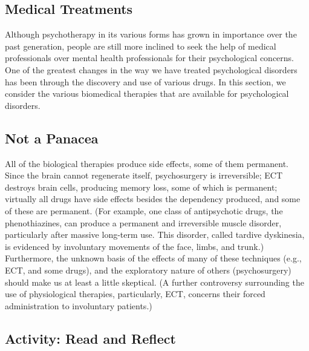 \documentclass[
]{book}
\begin{document}
\hypertarget{medical-treatments}{%
\subsection*{Medical Treatments}\label{medical-treatments}}

Although psychotherapy in its various forms has grown in importance over the past generation, people are still more inclined to seek the help of medical professionals over mental health professionals for their psychological concerns. One of the greatest changes in the way we have treated psychological disorders has been through the discovery and use of various drugs. In this section, we consider the various biomedical therapies that are available for psychological disorders.

\hypertarget{not-a-panacea}{%
\subsection*{Not a Panacea}\label{not-a-panacea}}

All of the biological therapies produce side effects, some of them permanent. Since the brain cannot regenerate itself, psychosurgery is irreversible; ECT destroys brain cells, producing memory loss, some of which is permanent; virtually all drugs have side effects besides the dependency produced, and some of these are permanent. (For example, one class of antipsychotic drugs, the phenothiazines, can produce a permanent and irreversible muscle disorder, particularly after massive long-term use. This disorder, called tardive dyskinesia, is evidenced by involuntary movements of the face, limbs, and trunk.) Furthermore, the unknown basis of the effects of many of these techniques (e.g., ECT, and some drugs), and the exploratory nature of others (psychosurgery) should make us at least a little skeptical. (A further controversy surrounding the use of physiological therapies, particularly, ECT, concerns their forced administration to involuntary patients.)

\hypertarget{activity-read-and-reflect-22}{%
\subsection*{Activity: Read and Reflect}\label{activity-read-and-reflect-22}}
\end{document}
